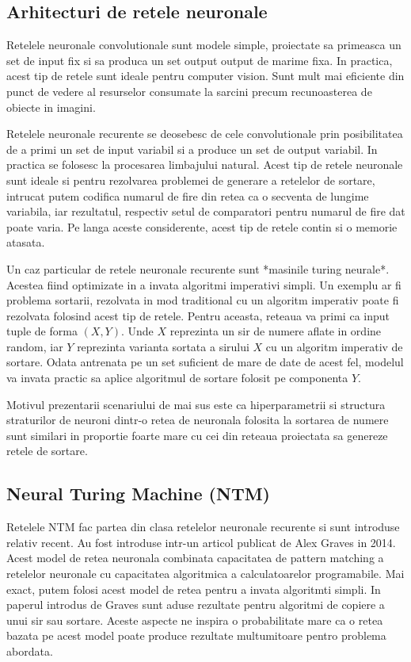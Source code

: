 \documentclass[12pt]{article}
\begin{document}
\subsection{Arhitecturi de retele neuronale}
Retelele neuronale convolutionale sunt modele simple, proiectate sa primeasca un set de input fix si sa produca un set output output de marime fixa. In practica, acest tip de retele sunt ideale pentru computer vision. Sunt mult mai eficiente din punct de vedere al resurselor consumate la sarcini precum recunoasterea de obiecte in imagini. 

Retelele neuronale recurente se deosebesc de cele convolutionale prin posibilitatea de a primi un set de input variabil si a produce un set de output variabil. In practica se folosesc la procesarea limbajului natural. Acest tip de retele neuronale sunt ideale si pentru rezolvarea problemei de generare a retelelor de sortare, intrucat putem codifica numarul de fire din retea ca o secventa de lungime variabila, iar rezultatul, respectiv setul de comparatori pentru numarul de fire dat poate varia. Pe langa aceste considerente, acest tip de retele contin si o memorie atasata.

Un caz particular de retele neuronale recurente sunt *masinile turing neurale*. Acestea fiind optimizate in a invata algoritmi imperativi simpli. Un exemplu ar fi problema sortarii, rezolvata in mod traditional cu un algoritm imperativ poate fi rezolvata folosind acest tip de retele. Pentru aceasta, reteaua va primi ca input tuple de forma $(X, Y)$. Unde $X$ reprezinta un sir de numere aflate in ordine random, iar $Y$ reprezinta varianta sortata a sirului $X$ cu un algoritm imperativ de sortare. Odata antrenata pe un set suficient de mare de date de acest fel, modelul va invata practic sa aplice algoritmul de sortare folosit pe componenta $Y$. 

Motivul prezentarii scenariului de mai sus este ca hiperparametrii si structura straturilor de neuroni dintr-o retea de neuronala folosita la sortarea de numere sunt similari in proportie foarte mare cu cei din reteaua proiectata sa genereze retele de sortare.

\subsection{Neural Turing Machine (NTM)}

Retelele NTM fac partea din clasa retelelor neuronale recurente si sunt introduse relativ recent. Au fost introduse intr-un articol publicat de Alex Graves in 2014. Acest model de retea neuronala combinata capacitatea de pattern matching a retelelor neuronale cu capacitatea algoritmica a calculatoarelor programabile. Mai exact, putem folosi acest model de retea pentru a invata algoritmti simpli. In paperul introdus de Graves sunt aduse rezultate pentru algoritmi de copiere a unui sir sau sortare. Aceste aspecte ne inspira o probabilitate mare ca o retea bazata pe acest model poate produce rezultate multumitoare pentro problema abordata.
\end{document}
